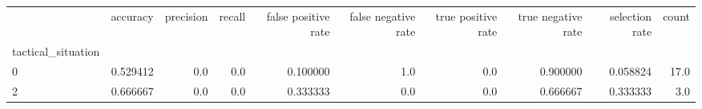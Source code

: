 \begin{tabular}{lrrrrrrrrr}
\toprule
{} &  accuracy &  precision &  recall &  false positive rate &  false negative rate &  true positive rate &  true negative rate &  selection rate &  count \\
tactical\_situation &           &            &         &                      &                      &                     &                     &                 &        \\
\midrule
0                  &  0.529412 &        0.0 &     0.0 &             0.100000 &                  1.0 &                 0.0 &            0.900000 &        0.058824 &   17.0 \\
2                  &  0.666667 &        0.0 &     0.0 &             0.333333 &                  0.0 &                 0.0 &            0.666667 &        0.333333 &    3.0 \\
\bottomrule
\end{tabular}
